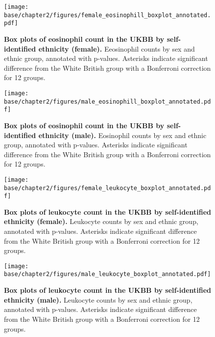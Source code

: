 \newpage

\begin{figure}[ht]
    \centering
    \texttt{[image: base/chapter2/figures/female\_eosinophill\_boxplot\_annotated.pdf]}
    \caption[Box plots of eosinophil count in the UKBB by self-identified ethnicity (female)]{\textbf{Box plots of eosinophil count in the UKBB by self-identified ethnicity (female).} Eeosinophil counts by sex and ethnic group, annotated with p-values. Asterisks indicate significant difference from the White British group with a Bonferroni correction for 12 groups.}
    \label{fig:supp_box_eosinophill_f}
\end{figure}

\newpage

\begin{figure}[ht]
    \centering
    \texttt{[image: base/chapter2/figures/male\_eosinophill\_boxplot\_annotated.pdf]}
    \caption[Box plots of eosinophil count in the UKBB by self-identified ethnicity (male)]{\textbf{Box plots of eosinophil count in the UKBB by self-identified ethnicity (male).} Eosinophil counts by sex and ethnic group, annotated with p-values. Asterisks indicate significant difference from the White British group with a Bonferroni correction for 12 groups.}
    \label{fig:supp_box_eosinophill_m}
\end{figure}

\newpage

\begin{figure}[ht]
    \centering
    \texttt{[image: base/chapter2/figures/female\_leukocyte\_boxplot\_annotated.pdf]}
    \caption[Box plots of leukocyte count in the UKBB by self-identified ethnicity (female)]{\textbf{Box plots of leukocyte count in the UKBB by self-identified ethnicity (female).} Leukocyte counts by sex and ethnic group, annotated with p-values. Asterisks indicate significant difference from the White British group with a Bonferroni correction for 12 groups.}
    \label{fig:supp_box_leukocyte_f}
\end{figure}

\newpage

\begin{figure}[ht]
    \centering
    \texttt{[image: base/chapter2/figures/male\_leukocyte\_boxplot\_annotated.pdf]}
    \caption[Box plots of leukocyte count in the UKBB by self-identified ethnicity (male)]{\textbf{Box plots of leukocyte count in the UKBB by self-identified ethnicity (male).} Leukocyte counts by sex and ethnic group, annotated with p-values. Asterisks indicate significant difference from the White British group with a Bonferroni correction for 12 groups.}
    \label{fig:supp_box_leukocyte_m}
\end{figure}


